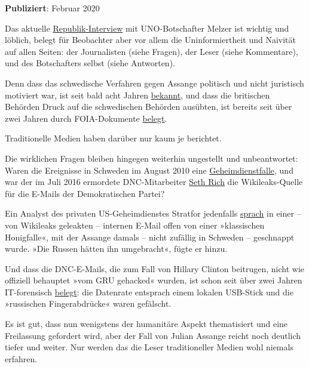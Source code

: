 \textbf{Publiziert}: Februar 2020

Das aktuelle
\href{https://www.republik.ch/2020/01/31/nils-melzer-spricht-ueber-wikileaks-gruender-julian-assange}{Republik-Interview}
mit UNO-Botschafter Melzer ist wichtig und löblich, belegt für
Beobachter aber vor allem die Uninformiertheit und Naivität auf allen
Seiten: der Journalisten (siehe Fragen), der Leser (siehe Kommentare),
und des Botschafters selbst (siehe Antworten).

Denn dass das schwedische Verfahren gegen Assange politisch und nicht
juristisch motiviert war, ist seit bald acht Jahren
\href{https://www.craigmurray.org.uk/archives/2016/02/why-the-assange-allegation-is-a-stitch-up/}{bekannt},
und dass die britischen Behörden Druck auf die schwedischen Behörden
ausübten, ist bereits seit über zwei Jahren durch FOIA-Dokumente
\href{https://www.theguardian.com/media/2018/feb/11/sweden-tried-to-drop-assange-extradition-in-2013-cps-emails-show}{belegt}.

Traditionelle Medien haben darüber nur kaum je berichtet.

Die wirklichen Fragen bleiben hingegen weiterhin ungestellt und
unbeantwortet: Waren die Ereignisse in Schweden im August 2010 eine
\href{https://www.smh.com.au/technology/victims-jilted-lovers-or-undercover-agents-20101218-191ae.html}{Geheimdienstfalle},
und war der im Juli 2016 ermordete DNC-Mitarbeiter
\href{https://www.youtube.com/watch?v=Kp7FkLBRpKg}{Seth Rich} die
Wikileaks-Quelle für die E-Mails der Demokratischen Partei?

Ein Analyst des privaten US-Geheimdienstes Stratfor jedenfalls
\href{https://search.wikileaks.org/gifiles/emailid/1705742}{sprach} in
einer -- von Wikileaks geleakten -- internen E-Mail offen von einer
»klassischen Honigfalle«, mit der Assange damals -- nicht zufällig in
Schweden -- geschnappt wurde. »Die Russen hätten ihn umgebracht«, fügte
er hinzu.

Und dass die DNC-E-Mails, die zum Fall von Hillary Clinton beitrugen,
nicht wie offiziell behauptet »vom GRU gehacked« wurden, ist schon seit
über zwei Jahren IT-forensisch
\href{https://consortiumnews.com/2018/08/13/too-big-to-fail-russia-gate-one-year-after-vips-showed-a-leak-not-a-hack/}{belegt}:
die Datenrate entsprach einem lokalen USB-Stick und die »russischen
Fingerabdrücke« waren gefälscht.

Es ist gut, dass nun wenigstens der humanitäre Aspekt thematisiert und
eine Freilassung gefordert wird, aber der Fall von Julian Assange reicht
noch deutlich tiefer und weiter. Nur werden das die Leser traditioneller
Medien wohl niemals erfahren.

